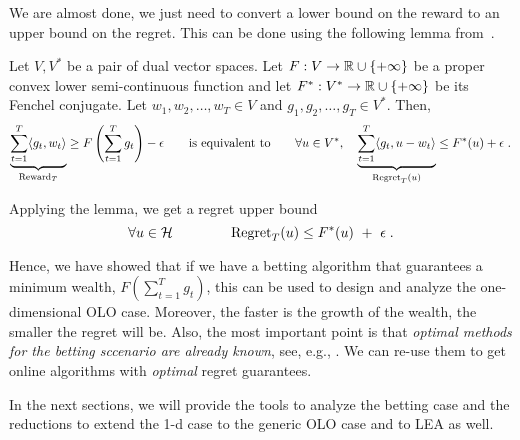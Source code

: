 We are almost done, we just need to convert a lower bound on the reward to an
upper bound on the regret. This can be done using the following lemma
from~\cite{McMahan-Orabona-2014}.
\begin{lemma}
\label{lemma:reward-regret}
Let $V,V^*$ be a pair of dual vector spaces. Let $F:V \to \mathbb{R} \cup \{+\infty\}$
be a proper convex lower semi-continuous function and let $F^*:V^* \to \mathbb{R} \cup
\{+\infty\}$ be its Fenchel conjugate. Let $w_1, w_2, \dots, w_T \in V$ and
$g_1, g_2, \dots, g_T \in V^*$.  Then,
\[
\underbrace{\sum_{t=1}^T \langle g_t, w_t \rangle}_{\operatorname{Reward}_T} \ge F\left( \sum_{t=1}^T g_t \right) -\epsilon
\qquad \text{is equivalent to} \qquad
\forall u \in V^*, \quad
\underbrace{\sum_{t=1}^T \langle g_t, u - w_t\rangle}_{\operatorname{Regret}_T(u)} \le F^*(u) + \epsilon\; .
\]
\end{lemma}
\vspace{-.1cm}
Applying the lemma, we get a regret upper bound
\[
\forall u \in \mathcal{H} \qquad \qquad
\operatorname{Regret}_T(u) \le F^*(u) \ + \ \epsilon \; .
\]

Hence, we have showed that if we have a betting algorithm that guarantees a
minimum wealth, $F(\sum_{t=1}^T g_t)$, this can be used to design and analyze
the one-dimensional \ac{OLO} case. Moreover, the faster is the growth of the wealth, the
smaller the regret will be.  
Also, the most important point is that \emph{optimal methods for the betting sccenario are already known}, see, e.g., \cite[Section 9]{Cesa-Bianchi-Lugosi-2006}. We can re-use them to get online algorithms with \emph{optimal} regret guarantees.

In the next sections, we will provide the tools to analyze the betting case and the reductions to extend the 1-d case to the generic \ac{OLO} case and to \ac{LEA} as well.
